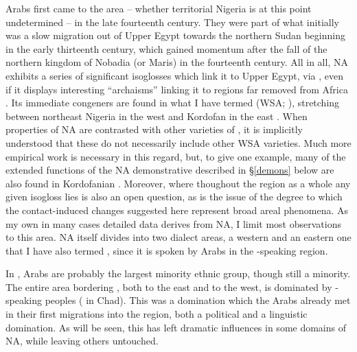\documentclass[output=paper]{langsci/langscibook}
\begin{document}
Arabs first came to the  area – whether territorial Nigeria is at this point undetermined – in the late fourteenth century. They were part of what initially was a slow migration out of Upper Egypt towards the northern Sudan beginning in the early thirteenth century, which gained momentum after the fall of the northern  kingdom of Nobadia (or Maris) in the fourteenth century. All in all, NA exhibits a series of significant isoglosses which link it to Upper Egypt, via  , even if it displays interesting “archaisms” linking it to regions far removed from Africa \citep{Owens2013}. Its immediate congeners are found in what I have termed    (WSA; \citealt{Owens1994editor,Owens1994author}), stretching between northeast Nigeria in the west and Kordofan in the east \citep{Manfredi2010}. When properties of NA are contrasted with other varieties of , it is implicitly understood that these do not necessarily include other WSA varieties. Much more empirical work is necessary in this regard, but, to give one example, many of the extended functions of the NA demonstrative described in §\ref{demons} below are also found in Kordofanian  \citep{Manfredi2014demonstratives}. Moreover, where thoughout the  region as a whole any given isogloss lies is also an open question, as is the issue of the degree to which the contact-induced changes suggested here represent broad areal phenomena. As my own in many cases detailed data derives from NA, I limit most observations to this area. NA itself divides into two dialect areas, a western and an eastern one that I have also termed  , since it is spoken by Arabs in the -speaking region.

In , Arabs are probably the largest minority ethnic group, though still a minority. The entire area bordering , both to the east and to the west, is dominated by -speaking peoples ( in Chad). This was a domination which the Arabs already met in their first migrations into the region, both a political and a linguistic domination. As will be seen, this has left dramatic influences in some domains of NA, while leaving others untouched.
\end{document}
